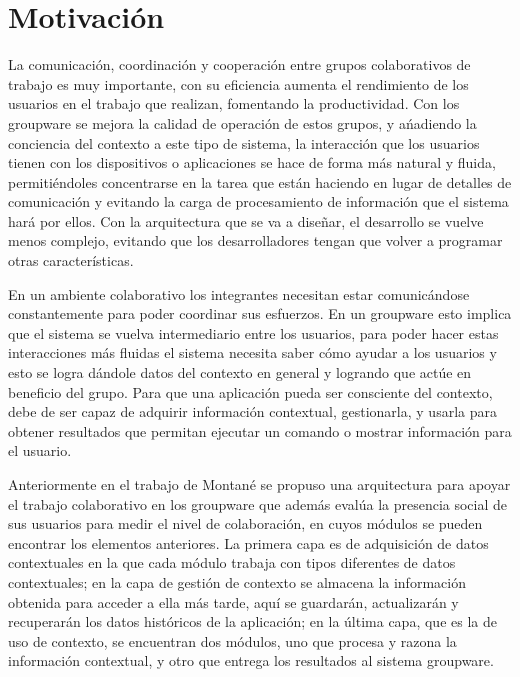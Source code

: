 \section{Motivaci\'on}
La comunicaci\'on, coordinaci\'on y cooperaci\'on entre grupos colaborativos de trabajo es muy importante, con su eficiencia aumenta el rendimiento de los usuarios en el trabajo que realizan, fomentando la productividad. Con los groupware se mejora la calidad de operaci\'on de estos grupos, y a\'nadiendo la conciencia del contexto a este tipo de sistema, la interacci\'on que los usuarios tienen con los dispositivos o aplicaciones se hace de forma m\'as natural y fluida, permiti\'endoles concentrarse en la tarea que est\'an haciendo en lugar de detalles de comunicaci\'on y evitando la carga de procesamiento de informaci\'on que el sistema har\'a por ellos. Con la arquitectura que se va a dise\~nar, el desarrollo se vuelve menos complejo, evitando que los desarrolladores tengan que volver a programar otras  caracter\'isticas.
 
En un ambiente colaborativo los integrantes necesitan estar comunic\'andose  constantemente para poder coordinar sus esfuerzos. En un groupware esto implica que el sistema se vuelva intermediario entre los usuarios,  para poder hacer estas interacciones m\'as fluidas el sistema necesita saber c\'omo ayudar a los usuarios y esto se logra d\'andole datos del contexto en general y logrando que act\'ue  en beneficio del grupo. Para que una aplicaci\'on pueda ser consciente del contexto, debe de ser capaz de adquirir informaci\'on contextual, gestionarla, y usarla para obtener resultados que permitan ejecutar un comando o mostrar informaci\'on para el usuario. 

Anteriormente en el trabajo de Montan\'e\citep{montane2013context} se propuso una arquitectura para apoyar el trabajo colaborativo en los groupware que adem\'as eval\'ua la presencia social de sus usuarios para medir el nivel de colaboraci\'on, en cuyos m\'odulos se pueden encontrar los elementos anteriores. La primera capa es de adquisici\'on de datos contextuales en la que cada m\'odulo trabaja con tipos diferentes de datos contextuales; en la capa de gesti\'on de contexto se almacena la informaci\'on obtenida para acceder a ella m\'as tarde, aqu\'i se guardar\'an, actualizar\'an y recuperar\'an los datos hist\'oricos de la aplicaci\'on; en la \'ultima capa, que es la de uso de contexto, se encuentran dos m\'odulos, uno que procesa y razona la informaci\'on contextual, y otro que entrega los resultados al sistema groupware.

